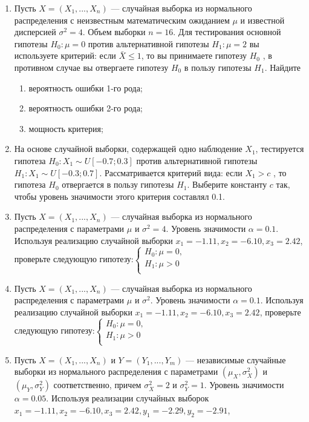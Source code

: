 \documentclass[12pt]{article}
\begin{document}
\begin{enumerate}
\item Пусть $X = (X_{1},..., X_{n})$ — случайная выборка из нормального распределения с неизвестным математическим ожиданием $\mu$ и известной дисперсией $\sigma^2 = 4$. Объем выборки $n = 16$. Для тестирования основной гипотезы $H_{0}:\mu = 0$ против
альтернативной гипотезы $H_{1}:\mu = 2$ вы используете критерий: если $\bar{X} \leq 1$, то вы принимаете гипотезу $H_{0}$ , в противном случае вы отвергаете гипотезу $H_{0}$ в пользу гипотезы $H_{1}$. Найдите

\begin{enumerate}
   \item  вероятность ошибки 1-го рода;
   \item вероятность ошибки 2-го рода;
   \item мощность критерия;
\end{enumerate}


\item На основе случайной выборки, содержащей одно наблюдение $X_{1}$, тестируется гипотеза $H_{0} : X_{1} \sim U[-0.7;0.3]$ против альтернативной гипотезы $H_{1}: X_{1} \sim U[-0.3;0.7]$. Рассматривается критерий вида: если $X_{1} > c$ , то гипотеза $H_{0}$ отвергается в пользу гипотезы $H_{1}$. Выберите константу $c$ так, чтобы уровень значимости этого критерия составлял 0.1.

\item Пусть $X = (X_{1},..., X_{n})$ — случайная выборка из нормального распределения с параметрами $\mu$ и $\sigma^2 = 4$. Уровень значимости  $\alpha = 0.1$. Используя
реализацию случайной выборки $x_{1} = -1.11, x_{2} = -6.10, x_{3} = 2.42$, проверьте следующую гипотезу:$\begin{cases}
H_{0}:\mu = 0, \\
H_{1}:\mu > 0 \\
\end{cases}$

\item Пусть $X = (X_{1},..., X_{n})$ — случайная выборка из нормального распределения с параметрами $\mu$ и $\sigma^2$. Уровень значимости  $\alpha = 0.1$. Используя
реализацию случайной выборки $x_{1} = -1.11, x_{2} = -6.10, x_{3} = 2.42$, проверьте следующую гипотезу:$\begin{cases}
H_{0}:\mu = 0, \\
H_{1}:\mu > 0 \\
\end{cases}$

\item Пусть $X = (X_{1},..., X_{n})$ и $Y = (Y_{1},..., Y_{m})$ — независимые случайные
выборки из нормального распределения с параметрами $(\mu_{X},\sigma^2_{X})$ и $(\mu_{Y},\sigma^2_{Y})$ соответственно, причем  $\sigma^2_{X} = 2$ и $\sigma^2_{Y} = 1$. Уровень значимости $\alpha = 0.05$. Используя реализации случайных выборок\newline
\hspace*{3cm}$x_{1} = -1.11, x_{2} = -6.10, x_{3} = 2.42, y_{1} = -2.29, y_{2} = -2.91$,


\end{enumerate}
\end{document}
